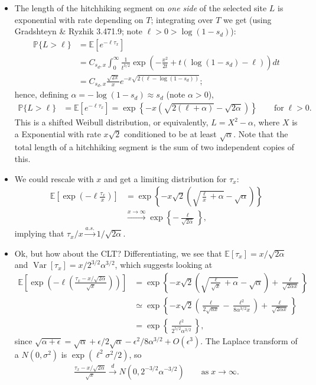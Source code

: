 \documentclass{article}
\newcommand{\E}{\mathbb{E}}
\renewcommand{\P}{\mathbb{P}}
\newcommand{\var}{\mathop{\mbox{Var}}}
\begin{document}
\begin{itemize}
\item The length of the hitchhiking segment on \emph{one side} of the selected site $L$ is exponential with rate depending on $T$;
integrating over $T$ we get
(using Gradshteyn \& Ryzhik 3.471.9; note $\ell > 0 > \log(1-s_d)$):
\begin{align}
 \P\{ L > \ell \} &= \E\left[ e^{-\ell \tau_x} \right] \\
 & = C_{s_d,x} \int_0^\infty \frac{1}{t^{3/2}} \exp\left(-\frac{x^2}{2t} + t(\log(1-s_d) -\ell) \right)  dt \\
 &= C_{s_d,x} \frac{\sqrt{2\pi}}{x} e^{-x\sqrt{2(\ell-\log(1-s_d))}} ; \label{eqn:first_integral}
\end{align}
hence, defining $\alpha = - \log(1-s_d) \approx s_d$ (note $\alpha>0$),
\begin{align}
 \P\{ L > \ell \} &= \E\left[ e^{-\ell \tau_x} \right] = \exp\left\{{-x\left(\sqrt{2(\ell+\alpha)} - \sqrt{2\alpha}\right)}\right\} \qquad \mbox{for}\; \ell>0.
\end{align}
This is a shifted Weibull distribution, or equivalently, $L=X^2-\alpha$, where $X$ is a Exponential with rate $x\sqrt{2}$ conditioned to be at least $\sqrt{\alpha}$.
Note that the total length of a hitchhiking segment is the sum of two independent copies of this.

\item We could rescale with $x$ and get a limiting distribution for $\tau_x$:
\begin{align}
  \E\left[\exp\left( -\ell \frac{\tau_x}{x} \right)\right]
        &= \exp\left\{ - x\sqrt{2}\left(\sqrt{\frac{\ell}{x}+\alpha} - \sqrt{\alpha}\right) \right\} \\
        &\xrightarrow{x\to\infty} \exp\left\{ - \frac{\ell}{\sqrt{2\alpha}} \right\} ,
\end{align}
implying that $\tau_x/x \xrightarrow{a.s.} 1/\sqrt{2\alpha}$.

\item Ok, but how about the CLT?  Differentiating, we see that $\E[\tau_x]=x/\sqrt{2\alpha}$ and $\var[\tau_x]=x/2^{3/2}\alpha^{3/2}$,
which suggests looking at
\begin{align}
\E\left[\exp\left( -\ell \left(\frac{\tau_x-x/\sqrt{2\alpha}}{\sqrt{x}} \right) \right)\right]
    &= \exp\left\{ - x\sqrt{2}\left(\sqrt{\frac{\ell}{\sqrt{x}}+\alpha} - \sqrt{\alpha}\right) + \frac{\ell}{\sqrt{2\alpha x}} \right\} \\
    &\simeq \exp\left\{ - x\sqrt{2}\left( \frac{\ell}{2\sqrt{\alpha x}} - \frac{\ell^2}{8\alpha^{3/2}x}  \right) + \frac{\ell}{\sqrt{2\alpha x}} \right\} \\
    &= \exp\left\{ \frac{\ell^2}{2^{5/2}\alpha^{3/2}} \right\} ,
\end{align}
since $\sqrt{\alpha+\epsilon}=\sqrt{\alpha} +\epsilon/2\sqrt{\alpha}-\epsilon^2/8\alpha^{3/2} + O(\epsilon^3)$.
The Laplace transform of a $N(0,\sigma^2)$ is $\exp(\ell^2\sigma^2/2)$, so
\begin{align}
\frac{\tau_x - x/\sqrt{2\alpha}}{\sqrt{x}} \xrightarrow{d} N(0,2^{-3/2}\alpha^{-3/2}) \qquad \mbox{as}\;x\to\infty.
\end{align}


\end{itemize}
\end{document}
